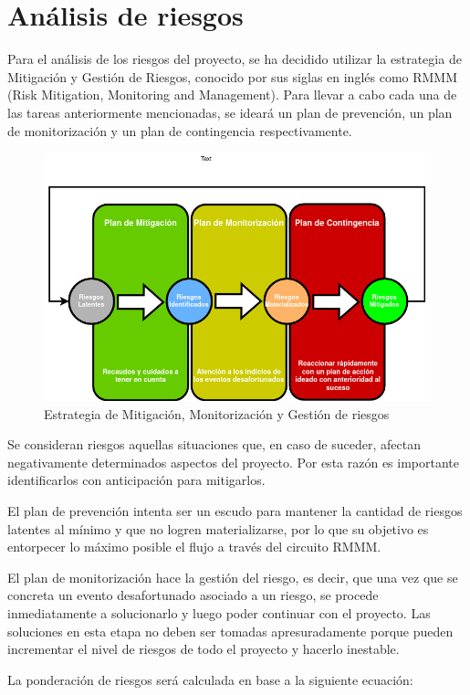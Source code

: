 \chapter{Análisis de riesgos}

Para el análisis de los riesgos del proyecto, se ha decidido utilizar la estrategia de Mitigación y Gestión de Riesgos, conocido por sus siglas en inglés como RMMM (Risk Mitigation, Monitoring and Management). Para llevar a cabo cada una de las tareas anteriormente mencionadas, se ideará un plan de prevención, un plan de monitorización y un plan de contingencia respectivamente.

\begin{figure}[H]
   \centering
   \includegraphics[trim={0 0 0 2cm}, clip, width=0.8\linewidth]{images/rmmm.jpg}
   \caption{Estrategia de Mitigación, Monitorización y Gestión de riesgos}
   \label{fig:rmmm}
\end{figure}

Se consideran riesgos aquellas situaciones que, en caso de suceder, afectan negativamente determinados aspectos del proyecto. Por esta razón es importante identificarlos con anticipación para mitigarlos.

El plan de prevención intenta ser un escudo para mantener la cantidad de riesgos latentes al mínimo y que no logren materializarse, por lo que su objetivo es entorpecer lo máximo posible el flujo a través del circuito RMMM.

El plan de monitorización hace la gestión del riesgo, es decir, que una vez que se concreta un evento desafortunado asociado a un riesgo, se procede inmediatamente a solucionarlo y luego poder continuar con el proyecto. Las soluciones en esta etapa no deben ser tomadas apresuradamente porque pueden incrementar el nivel de riesgos de todo el proyecto y hacerlo inestable.

La ponderación de riesgos será calculada en base a la siguiente ecuación:

